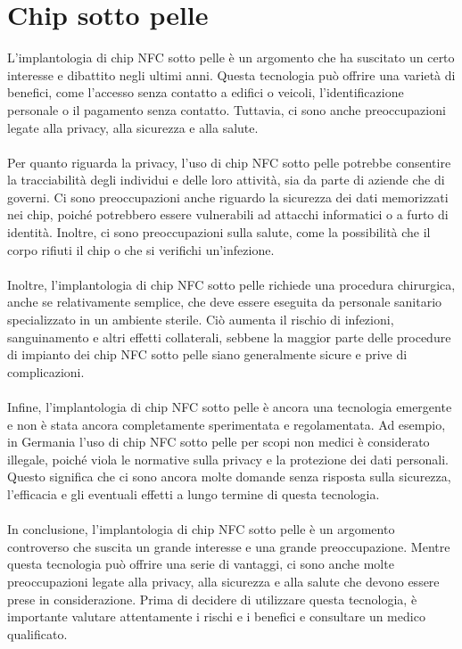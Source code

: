 \documentclass[a4paper,11pt]{report}
\begin{document}
\section{Chip sotto pelle}
L'implantologia di chip NFC sotto pelle è un argomento che ha suscitato un certo interesse e dibattito negli ultimi anni. Questa tecnologia può offrire una varietà di benefici, come l'accesso senza contatto a edifici o veicoli, l'identificazione personale o il pagamento senza contatto. Tuttavia, ci sono anche preoccupazioni legate alla privacy, alla sicurezza e alla salute.\\\\ Per quanto riguarda la privacy, l'uso di chip NFC sotto pelle potrebbe consentire la tracciabilità degli individui e delle loro attività, sia da parte di aziende che di governi. Ci sono preoccupazioni anche riguardo la sicurezza dei dati memorizzati nei chip, poiché potrebbero essere vulnerabili ad attacchi informatici o a furto di identità. Inoltre, ci sono preoccupazioni sulla salute, come la possibilità che il corpo rifiuti il chip o che si verifichi un'infezione.\\\\ Inoltre, l'implantologia di chip NFC sotto pelle richiede una procedura chirurgica, anche se relativamente semplice, che deve essere eseguita da personale sanitario specializzato in un ambiente sterile. Ciò aumenta il rischio di infezioni, sanguinamento e altri effetti collaterali, sebbene la maggior parte delle procedure di impianto dei chip NFC sotto pelle siano generalmente sicure e prive di complicazioni.\\\\ Infine, l'implantologia di chip NFC sotto pelle è ancora una tecnologia emergente e non è stata ancora completamente sperimentata e regolamentata. Ad esempio, in Germania l'uso di chip NFC sotto pelle per scopi non medici è considerato illegale, poiché viola le normative sulla privacy e la protezione dei dati personali. Questo significa che ci sono ancora molte domande senza risposta sulla sicurezza, l'efficacia e gli eventuali effetti a lungo termine di questa tecnologia. \\\\
In conclusione, l'implantologia di chip NFC sotto pelle è un argomento controverso che suscita un grande interesse e una grande preoccupazione. Mentre questa tecnologia può offrire una serie di vantaggi, ci sono anche molte preoccupazioni legate alla privacy, alla sicurezza e alla salute che devono essere prese in considerazione. Prima di decidere di utilizzare questa tecnologia, è importante valutare attentamente i rischi e i benefici e consultare un medico qualificato.
\end{document}
